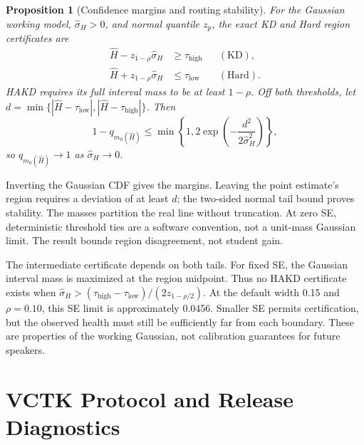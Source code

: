 \documentclass[journal]{IEEEtran}
\newtheorem{proposition}{Proposition}
\begin{document}
\begin{proposition}[Confidence margins and routing stability]
\label{prop:routing_stability}
For the Gaussian working model, $\widehat\sigma_H>0$, and normal quantile $z_p$, the exact KD and Hard region certificates are
\begin{equation}
\begin{aligned}
\widehat H-z_{1-\rho}\widehat\sigma_H&\ge\tau_{\mathrm{high}} &&(\mathrm{KD}),\\
\widehat H+z_{1-\rho}\widehat\sigma_H&\le\tau_{\mathrm{low}} &&(\mathrm{Hard}).
\end{aligned}
\label{eq:confidence_margins}
\end{equation}
HAKD requires its full interval mass to be at least $1-\rho$. Off both thresholds, let $d=\min\{|\widehat H-\tau_{\mathrm{low}}|,|\widehat H-\tau_{\mathrm{high}}|\}$. Then
\begin{equation}
1-q_{m_0(\widehat H)}\le\min\!\left\{1,2\exp\!\left(-\frac{d^2}{2\widehat\sigma_H^2}\right)\right\},
\label{eq:stability}
\end{equation}
so $q_{m_0(\widehat H)}\to1$ as $\widehat\sigma_H\to0$.
\end{proposition}
Inverting the Gaussian CDF gives the margins. Leaving the point estimate's region requires a deviation of at least $d$; the two-sided normal tail bound proves stability. The masses partition the real line without truncation. At zero SE, deterministic threshold ties are a software convention, not a unit-mass Gaussian limit. The result bounds region disagreement, not student gain.

The intermediate certificate depends on both tails. For fixed SE, the Gaussian interval mass is maximized at the region midpoint. Thus no HAKD certificate exists when $\widehat\sigma_H>(\tau_{\mathrm{high}}-\tau_{\mathrm{low}})/(2z_{1-\rho/2})$. At the default width 0.15 and $\rho=0.10$, this SE limit is approximately 0.0456. Smaller SE permits certification, but the observed health must still be sufficiently far from each boundary. These are properties of the working Gaussian, not calibration guarantees for future speakers.

\section{VCTK Protocol and Release Diagnostics}
\end{document}
